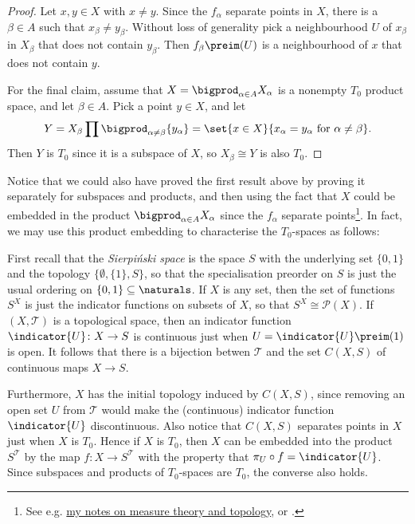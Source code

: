 \documentclass[article, a4paper, 11pt, oneside]{memoir}
\numberwithin{equation}{chapter}
\newcommand{\calT}{\mathcal{T}}
\newcommand{\calP}{\mathcal{P}}
\renewcommand{\powerset}[1]{\calP(#1)}
\begin{document}
\begin{proof}
    Let $x,y \in X$ with $x \neq y$. Since the $f_\alpha$ separate points in $X$, there is a $\beta \in A$ such that $x_\beta \neq y_\beta$. Without loss of generality pick a neighbourhood $U$ of $x_\beta$ in $X_\beta$ that does not contain $y_\beta$. Then $f_\beta\preim(U)$ is a neighbourhood of $x$ that does not contain $y$.

    For the final claim, assume that $X = \bigprod_{\alpha \in A} X_\alpha$ is a nonempty $T_0$ product space, and let $\beta \in A$. Pick a point $y \in X$, and let
    \begin{equation*}
        Y
            = X_\beta \prod \bigprod_{\alpha \neq \beta} \{y_\alpha\}
            = \set{x \in X}{x_\alpha = y_\alpha \text{ for } \alpha \neq \beta}.
    \end{equation*}
    Then $Y$ is $T_0$ since it is a subspace of $X$, so $X_\beta \cong Y$ is also $T_0$.
\end{proof}
%
Notice that we could also have proved the first result above by proving it separately for subspaces and products, and then using the fact that $X$ could be embedded in the product $\bigprod_{\alpha \in A} X_\alpha$ since the $f_\alpha$ separate points\footnote{See e.g. \href{https://github.com/dnhansen/topology-measure-theory-notes}{my notes on measure theory and topology}, or \textcite[Theorem~8.12]{willard}.}. In fact, we may use this product embedding to characterise the $T_0$-spaces as follows:

First recall that the \emph{Sierpi\'nski space} is the space $S$ with the underlying set $\{0,1\}$ and the topology $\{\emptyset, \{1\}, S\}$, so that the specialisation preorder on $S$ is just the usual ordering on $\{0,1\} \subseteq \naturals$. If $X$ is any set, then the set of functions $S^X$ is just the indicator functions on subsets of $X$, so that $S^X \cong \powerset{X}$. If $(X,\calT)$ is a topological space, then an indicator function $\indicator{U} \colon X \to S$ is continuous just when $U = \indicator{U}\preim(1)$ is open. It follows that there is a bijection betwen $\calT$ and the set $C(X,S)$ of continuous maps $X \to S$.

Furthermore, $X$ has the initial topology induced by $C(X,S)$, since removing an open set $U$ from $\calT$ would make the (continuous) indicator function $\indicator{U}$ discontinuous. Also notice that $C(X,S)$ separates points in $X$ just when $X$ is $T_0$. Hence if $X$ is $T_0$, then $X$ can be embedded into the product $S^\calT$ by the map $f \colon X \to S^\calT$ with the property that $\pi_U \circ f = \indicator{U}$. Since subspaces and products of $T_0$-spaces are $T_0$, the converse also holds.
\end{document}

